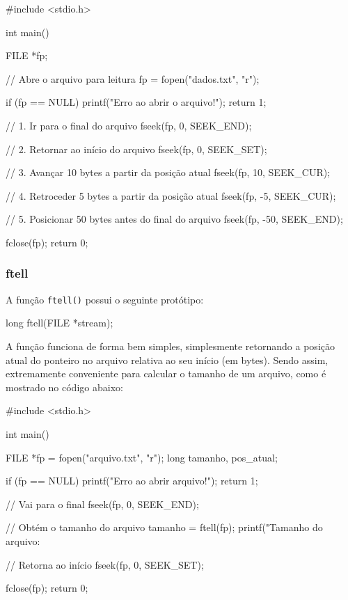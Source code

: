 \begin{excode}
#include <stdio.h>

int main() {
    FILE *fp;
    
    // Abre o arquivo para leitura
    fp = fopen("dados.txt", "r");
    
    if (fp == NULL) {
        printf("Erro ao abrir o arquivo!\n");
        return 1;
    }
    
    // 1. Ir para o final do arquivo
    fseek(fp, 0, SEEK_END);
    
    // 2. Retornar ao início do arquivo
    fseek(fp, 0, SEEK_SET);
    
    // 3. Avançar 10 bytes a partir da posição atual
    fseek(fp, 10, SEEK_CUR);
    
    // 4. Retroceder 5 bytes a partir da posição atual
    fseek(fp, -5, SEEK_CUR);
    
    // 5. Posicionar 50 bytes antes do final do arquivo
    fseek(fp, -50, SEEK_END);
    
    fclose(fp);
    return 0;
}
\end{excode}

\subsubsection{ftell}

A função \texttt{ftell()} possui o seguinte protótipo:

\begin{excode}
long ftell(FILE *stream);
\end{excode}

A função funciona de forma bem simples, simplesmente retornando a posição atual do ponteiro no 
arquivo relativa ao seu início (em bytes). Sendo assim, extremamente conveniente para calcular o 
tamanho de um arquivo, como é mostrado no código abaixo:

\begin{excode}
#include <stdio.h>

int main() {
    FILE *fp = fopen("arquivo.txt", "r");
    long tamanho, pos_atual;
    
    if (fp == NULL) {
        printf("Erro ao abrir arquivo!\n");
        return 1;
    }
    
    // Vai para o final
    fseek(fp, 0, SEEK_END);
    
    // Obtém o tamanho do arquivo
    tamanho = ftell(fp);
    printf("Tamanho do arquivo: %
    
    // Retorna ao início
    fseek(fp, 0, SEEK_SET);
    
    fclose(fp);
    return 0;
}
\end{excode}

